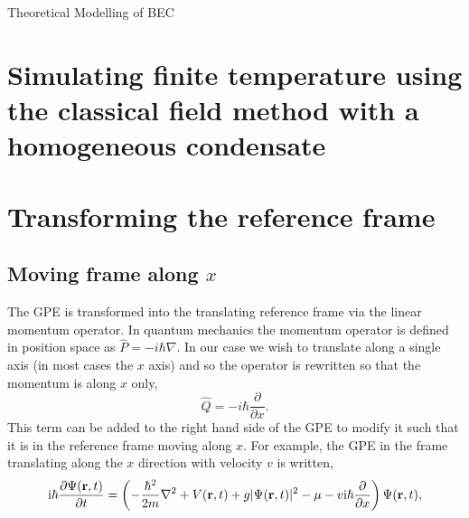 \begin{chapter}{\label{cha:theoretical_model}Theoretical Modelling of BEC}
\section{\label{section:cfield} Simulating finite temperature using the classical field method with a homogeneous condensate}


\section{\label{section:movframe} Transforming the reference frame}
	\subsection{\label{section:linearmovframe} Moving frame along $x$}

	The GPE is transformed into the translating reference frame via the linear momentum operator. In quantum mechanics the momentum operator is defined in position space as $\hat{P} = -i\hbar\nabla$. In our case we wish to translate along a single axis (in most cases the $x$ axis) and so the operator is rewritten so that the momentum is along $x$ only,
	\begin{equation*}
	\hat{Q} = -i\hbar\frac{\partial}{\partial x}.
	\end{equation*}
	This term can be added to the right hand side of the GPE to modify it such that it is in the reference frame moving along $x$. For example, the GPE in the frame translating along the $x$ direction with velocity $v$ is written,
	\begin{equation}\label{eq:linearframegpe}
	\mathrm{i}\hbar \frac{\partial\Psi({\bf r},t)}{\partial t} = \left(-\frac{\hbar^2}{2m}\nabla^2 + V({\bf r},t) + g|\Psi({\bf r},t)|^2 - \mu -v\mathrm{i}\hbar\frac{\partial}{\partial x} \right ) \Psi({\bf r},t),
	\end{equation}



\end{chapter}
